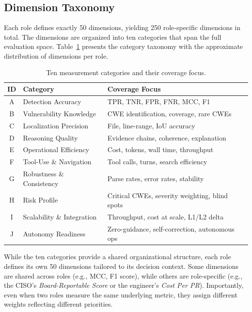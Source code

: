 \documentclass[10pt,twocolumn]{article}
\begin{document}
\subsection{Dimension Taxonomy}
\label{sec:taxonomy}

Each role defines exactly 50 dimensions, yielding 250 role-specific dimensions in total. The dimensions are organized into ten categories that span the full evaluation space. Table~\ref{tab:categories} presents the category taxonomy with the approximate distribution of dimensions per role.

\begin{table}[t]
\centering
\caption{Ten measurement categories and their coverage focus.}
\label{tab:categories}
\small
\begin{tabular}{@{}clp{3.5cm}@{}}
\toprule
\textbf{ID} & \textbf{Category} & \textbf{Coverage Focus} \\
\midrule
A & Detection Accuracy & TPR, TNR, FPR, FNR, MCC, F1 \\
B & Vulnerability Knowledge & CWE identification, coverage, rare CWEs \\
C & Localization Precision & File, line-range, IoU accuracy \\
D & Reasoning Quality & Evidence chains, coherence, explanation \\
E & Operational Efficiency & Cost, tokens, wall time, throughput \\
F & Tool-Use \& Navigation & Tool calls, turns, search efficiency \\
G & Robustness \& Consistency & Parse rates, error rates, stability \\
H & Risk Profile & Critical CWEs, severity weighting, blind spots \\
I & Scalability \& Integration & Throughput, cost at scale, L1/L2 delta \\
J & Autonomy Readiness & Zero-guidance, self-correction, autonomous ops \\
\bottomrule
\end{tabular}
\end{table}

While the ten categories provide a shared organizational structure, each role defines its own 50 dimensions tailored to its decision context. Some dimensions are shared across roles (e.g., MCC, F1 score), while others are role-specific (e.g., the CISO's \emph{Board-Reportable Score} or the engineer's \emph{Cost Per PR}). Importantly, even when two roles measure the same underlying metric, they assign different weights reflecting different priorities.
\end{document}

